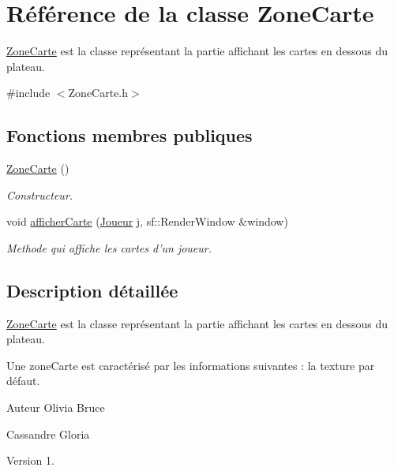 \hypertarget{classZoneCarte}{\section{\-Référence de la classe \-Zone\-Carte}
\label{classZoneCarte}
}


\hyperlink{classZoneCarte}{\-Zone\-Carte} est la classe représentant la partie affichant les cartes en dessous du plateau.  




{\ttfamily \#include $<$\-Zone\-Carte.\-h$>$}

\subsection*{\-Fonctions membres publiques}
\begin{DoxyCompactItemize}
\item 
\hyperlink{classZoneCarte_aa8ab7036b468aec8b80fb2a1cd7ad15a}{\-Zone\-Carte} ()
\begin{DoxyCompactList}\small\item\em \-Constructeur. \end{DoxyCompactList}\item 
void \hyperlink{classZoneCarte_ae60d85f22bb2dea8e632e947e22c1f79}{afficher\-Carte} (\hyperlink{classJoueur}{\-Joueur} j, sf\-::\-Render\-Window \&window)
\begin{DoxyCompactList}\small\item\em \-Methode qui affiche les cartes d'un joueur. \end{DoxyCompactList}\end{DoxyCompactItemize}


\subsection{\-Description détaillée}
\hyperlink{classZoneCarte}{\-Zone\-Carte} est la classe représentant la partie affichant les cartes en dessous du plateau. 

\-Une zone\-Carte est caractérisé par les informations suivantes \-: la texture par défaut.

\begin{DoxyAuthor}{\-Auteur}
\-Olivia \-Bruce 

\-Cassandre \-Gloria 
\end{DoxyAuthor}
\begin{DoxyVersion}{\-Version}
1. 
\end{DoxyVersion}


